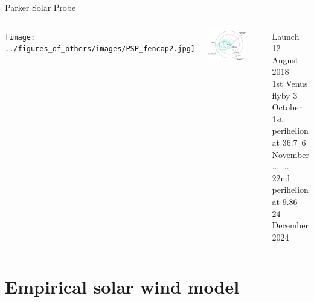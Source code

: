 \begin{frame}[plain,c]{Parker Solar Probe}{}
	\begin{columns}[c]
		
		\texttt{[image: ../figures\_of\_others/images/PSP\_fencap2.jpg]}


		\centering
		\vspace{-4mm}
		\includegraphics[width=0.75\textwidth]{../figures_of_others/images/PSP_MissionDesign2_negative_crop.png}
		\begin{block}{}
			Launch	\hfill	12 August 2018\\
			1st Venus flyby	\hfill	3 October\\
			1st perihelion at 36.7\,\Rs{}	\hfill	6 November\\
			...	\hfill	...\\
			22nd perihelion at 9.86\,\Rs{}	\hfill	24 December 2024
		\end{block}
	\end{columns}
\end{frame}


\section{Empirical solar wind model}

